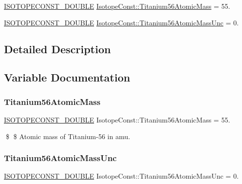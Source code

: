 \begin{DoxyCompactItemize}
\item 
\mbox{\hyperlink{group___isotope_const-_macros_ga8f45a7272ce02c0b4c65c44636ed719a}{I\+S\+O\+T\+O\+P\+E\+C\+O\+N\+S\+T\+\_\+\+D\+O\+U\+B\+LE}} \mbox{\hyperlink{group___isotope_const-_titanium-_ti56_gaf5ffd8602ad20155efee283d44c2dca6}{Isotope\+Const\+::\+Titanium56\+Atomic\+Mass}} = 55.
\item 
\mbox{\hyperlink{group___isotope_const-_macros_ga8f45a7272ce02c0b4c65c44636ed719a}{I\+S\+O\+T\+O\+P\+E\+C\+O\+N\+S\+T\+\_\+\+D\+O\+U\+B\+LE}} \mbox{\hyperlink{group___isotope_const-_titanium-_ti56_ga09184fcc54b2a528a0820a0aeadff533}{Isotope\+Const\+::\+Titanium56\+Atomic\+Mass\+Unc}} = 0.
\end{DoxyCompactItemize}


\subsection{Detailed Description}


\subsection{Variable Documentation}
\mbox{\label{group___isotope_const-_titanium-_ti56_gaf5ffd8602ad20155efee283d44c2dca6}} 
\subsubsection{\texorpdfstring{Titanium56\+Atomic\+Mass}{Titanium56AtomicMass}}
{\footnotesize\ttfamily \mbox{\hyperlink{group___isotope_const-_macros_ga8f45a7272ce02c0b4c65c44636ed719a}{I\+S\+O\+T\+O\+P\+E\+C\+O\+N\+S\+T\+\_\+\+D\+O\+U\+B\+LE}} Isotope\+Const\+::\+Titanium56\+Atomic\+Mass = 55.}

\$ \$ Atomic mass of Titanium-\/56 in amu. \mbox{\label{group___isotope_const-_titanium-_ti56_ga09184fcc54b2a528a0820a0aeadff533}} 
\subsubsection{\texorpdfstring{Titanium56\+Atomic\+Mass\+Unc}{Titanium56AtomicMassUnc}}
{\footnotesize\ttfamily \mbox{\hyperlink{group___isotope_const-_macros_ga8f45a7272ce02c0b4c65c44636ed719a}{I\+S\+O\+T\+O\+P\+E\+C\+O\+N\+S\+T\+\_\+\+D\+O\+U\+B\+LE}} Isotope\+Const\+::\+Titanium56\+Atomic\+Mass\+Unc = 0.}

